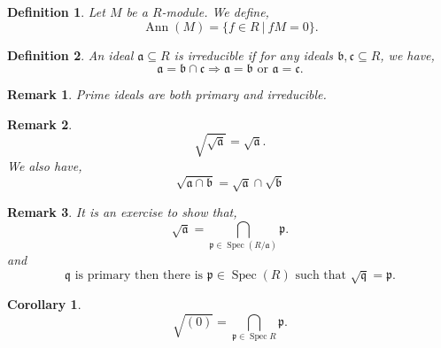 \documentclass{article}
\newtheorem{definition}{Definition}[section]
\newtheorem{remark}{Remark}[section]
\newtheorem{corollary}{Corollary} [section]
\DeclareMathOperator{\Spec}{Spec}
\DeclareMathOperator{\Ann}{Ann}
\newcommand{\sep}[0]{\:|\:}
\begin{document}
\begin{definition}
  Let $M$ be a $R$-module. We define,
  \begin{equation*}
    \Ann(M) = \{f\in R\sep fM = 0\}.
  \end{equation*}
\end{definition}

\begin{definition}
  An ideal $\mathfrak{a}\subseteq R$ is irreducible if for any ideals $\mathfrak{b},\mathfrak{c}\subseteq R$, we have,
  \begin{equation*}
    \mathfrak{a} = \mathfrak{b}\cap\mathfrak{c} \Rightarrow \mathfrak{a} = \mathfrak{b}\text{ or }\mathfrak{a} = \mathfrak{c}.
  \end{equation*}
\end{definition}

\begin{remark}
  Prime ideals are both primary and irreducible.
\end{remark}

\begin{remark}
  \begin{equation*}
    \sqrt{\sqrt{\mathfrak{a}}} = \sqrt{\mathfrak{a}}.
  \end{equation*}
  We also have,
  \begin{equation*}
    \sqrt{\mathfrak{a}\cap\mathfrak{b}} = \sqrt{\mathfrak{a}}\cap\sqrt{\mathfrak{b}}
  \end{equation*}
\end{remark}

\begin{remark}
  It is an exercise to show that,
  \begin{equation*}
    \sqrt{\mathfrak{a}} = \bigcap_{\mathfrak{p}\in \Spec(R/\mathfrak{a})}\mathfrak{p}.
  \end{equation*}
  and 
  \begin{equation*}
    \mathfrak{q}\text{ is primary then there is $\mathfrak{p}\in\Spec (R)$ such that }\sqrt{\mathfrak{q}}= \mathfrak{p}. 
  \end{equation*}
  \label{remark_alebra_fundamental}
\end{remark}

\begin{corollary}
  \begin{equation*}
    \sqrt{(0)} = \bigcap_{\mathfrak{p}\in\Spec R} \mathfrak{p}.
  \end{equation*}
\end{corollary}
\end{document}
